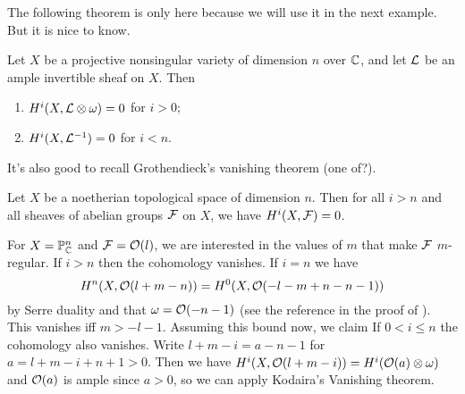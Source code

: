 The following theorem is only here because we will use it in the next example. But it is nice to know. 
\begin{theorem}
	Let $X$ be a projective nonsingular variety of dimension $n$ over $\mathbb{C}$, and let $\mathcal{L}$ be an ample invertible sheaf on $X$. Then \begin{enumerate}
    	\item $H^i(X, \mathcal{L}\otimes \omega) = 0$ for $i > 0$;
		\item $H^i(X, \mathcal{L}^{-1}) = 0$ for $i < n$. 
    \end{enumerate}
\end{theorem}
It's also good to recall Grothendieck's vanishing theorem (one of?).
\begin{theorem}
	Let $X$ be a noetherian topological space of dimension $n$. Then for all $i > n$ and all sheaves of abelian groups $\mathcal{F}$ on $X$, we have $H^i(X, \mathcal{F}) = 0$. 	
\end{theorem}

\begin{example}
	For $X = \mathbb{P}^n_{\mathbb{C}}$ and $\mathcal{F} = \mathcal{O}(l)$, 
	we are interested in the values of $m$ that make $\mathcal{F}$ $m$-regular. If $i > n$ then the cohomology vanishes. 
	If $i = n$ we have \[
    	H^n(X, \mathcal{O}(l + m - n)) = H^0(X, \mathcal{O}(-l-m + n -n-1))
    \]
	by Serre duality and that $\omega = \mathcal{O}(-n-1)$ (see the reference in the proof of \cite[Theorem~III.7.1]{hartshorne2013algebraic}).
	This vanishes iff $m > -l-1$. Assuming this bound now, we claim 
	If $0 < i \leq n$ the cohomology also vanishes.
	Write $l + m - i = a - n - 1$ for $a = l+m-i+n+1 > 0$. 
	Then we have $H^i(X, \mathcal{O}(l+m-i)) = H^i(\mathcal{O}(a) \otimes \omega)$ and $\mathcal{O}(a)$ is ample since $a > 0$, so we can apply Kodaira's Vanishing theorem.
\end{example}


